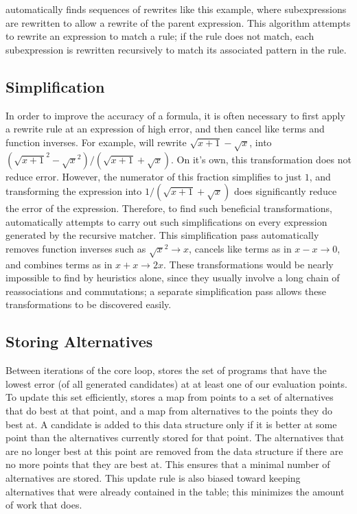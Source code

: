 \documentclass[paper.tex]{subfiles}
\begin{document}
\casio automatically finds sequences of rewrites like this example,
  where subexpressions are rewritten
  to allow a rewrite of the parent expression.
This algorithm attempts to rewrite an expression to match a rule;
  if the rule does not match,
  each subexpression is rewritten recursively
  to match its associated pattern in the rule.

\subsection{Simplification}

In order to improve the accuracy of a formula,
  it is often necessary to first apply a rewrite rule
  at an expression of high error,
  and then cancel like terms and function inverses.
For example, \casio will rewrite $\sqrt{x+1} - \sqrt{x}$,
  into $(\sqrt{x+1}^2 - \sqrt{x}^2) / (\sqrt{x+1} + \sqrt{x})$.
On it's own, this transformation does not reduce error.
However, the numerator of this fraction simplifies to just $1$,
  and transforming the expression into $1/(\sqrt{x+1} + \sqrt{x})$
  does significantly reduce the error of the expression.
Therefore, to find such beneficial transformations,
  \casio automatically attempts to carry out such simplifications
  on every expression generated by the recursive matcher.
This simplification pass automatically
  removes function inverses such as $\sqrt{x}^2 \to x$,
  cancels like terms as in $x - x \to 0$,
  and combines terms as in $x + x \to 2x$.
These transformations would be nearly impossible to find
  by heuristics alone, 
  since they usually involve a long chain of reassociations and commutations;
  a separate simplification pass allows these transformations
  to be discovered easily.

\subsection{Storing Alternatives}

Between iterations of the core loop,
  \casio stores the set of programs
  that have the lowest error (of all generated candidates)
  at at least one of our evaluation points.
To update this set efficiently, \casio stores
  a map from points to a set of alternatives that do best at that point,
  and a map from alternatives to the points they do best at.
A candidate is added to this data structure
  only if it is better at some point
  than the alternatives currently stored for that point.
The alternatives that are no longer best at this point
  are removed from the data structure
  if there are no more points that they are best at.
This ensures that a minimal number of alternatives are stored.
This update rule is also biased toward keeping alternatives
  that were already contained in the table;
  this minimizes the amount of work that \casio does.
\end{document}

